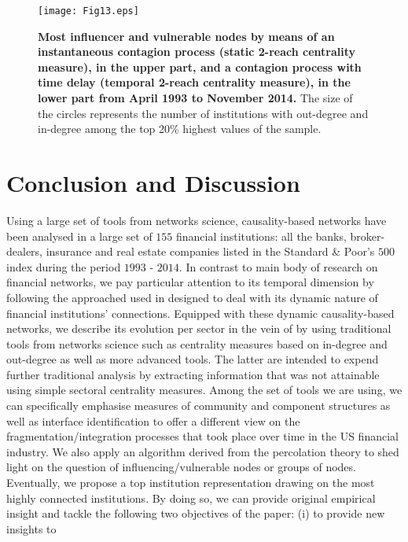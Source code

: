 \documentclass[a4paper,10pt]{article}
\begin{document}
 
\begin{figure}[!h]
\texttt{[image: Fig13.eps]}
\caption{{\bf  Most influencer and vulnerable nodes by means of an instantaneous contagion process (static 2-reach centrality 
measure), in the upper part, and a contagion process with time delay (temporal 2-reach centrality measure),  in the 
lower part from April 1993 to November 2014.} The size of the circles represents the number of institutions with out-degree 
and in-degree among the top 20\% highest values of the sample.}
\label{fig:13}
\end{figure}
\section{Conclusion and Discussion}
Using a large set of tools from networks science, causality-based networks have been analysed in a large set of $155$ financial 
institutions: all the banks, broker-dealers, insurance and real estate companies listed in the Standard \& Poor’s $500$ index 
during the period $1993$ - $2014$. In contrast to main body of research on financial networks, we pay particular attention to its 
temporal dimension by following the approached used in \cite{Geraci} designed to deal with its dynamic nature of financial institutions’
connections. Equipped with these dynamic causality-based networks, we describe its evolution per sector in the vein of \cite{Billio2} by 
using traditional tools from networks science such as centrality measures based on in-degree and out-degree as well as more
advanced tools. The latter are intended to expend further traditional analysis by extracting information that was not 
attainable using simple sectoral centrality measures. Among the set of tools we are using, we can specifically emphasise 
measures of community and component structures as well as interface identification to offer a different view on the 
fragmentation/integration processes that took place over time in the US financial industry. We also apply an algorithm 
derived from the percolation theory to shed light on the question of influencing/vulnerable nodes or groups of nodes. 
Eventually, we propose a top institution representation drawing on the most highly connected institutions.  By doing so, we 
can provide original empirical insight and tackle the following two objectives of the paper: (i) to provide new insights to 
\end{document}
